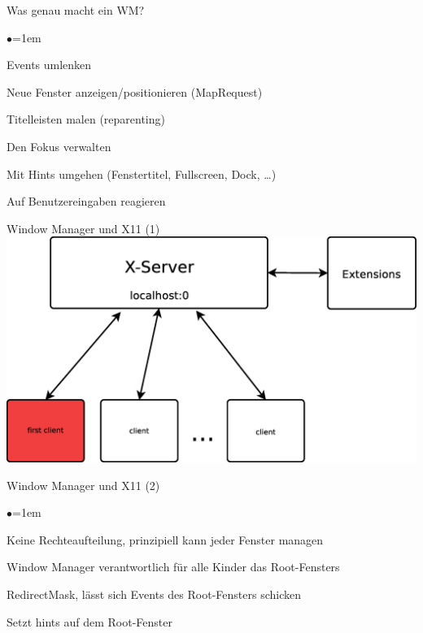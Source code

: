 \documentclass[mode=print,paper=screen,style=jefka]{powerdot}
\begin{document}
\begin{slide}{Was genau macht ein WM?}
\begin{list}{$\bullet$}{\itemsep=1em}
        \item<1-> Events umlenken
        \item<2-> Neue Fenster anzeigen/positionieren (MapRequest)
        \item<3-> Titelleisten malen (reparenting)
        \item<4-> Den Fokus verwalten
        \item<5-> Mit Hints umgehen (Fenstertitel, Fullscreen, Dock, …)
        \item<6-> Auf Benutzereingaben reagieren
\end{list}
\end{slide}


\begin{slide}[method=direct]{Window Manager und X11 (1)}
\includegraphics[width=1\textwidth]{xserver_konzept.eps}
\end{slide}

\begin{slide}{Window Manager und X11 (2)}
\begin{list}{$\bullet$}{\itemsep=1em}
        \item<1-> Keine Rechteaufteilung, prinzipiell kann jeder Fenster managen
        \item<2-> Window Manager verantwortlich für alle Kinder das Root-Fensters
        \item<3-> RedirectMask, lässt sich Events des Root-Fensters schicken
        \item<4-> Setzt hints auf dem Root-Fenster
\end{list}
\end{slide}
\end{document}
